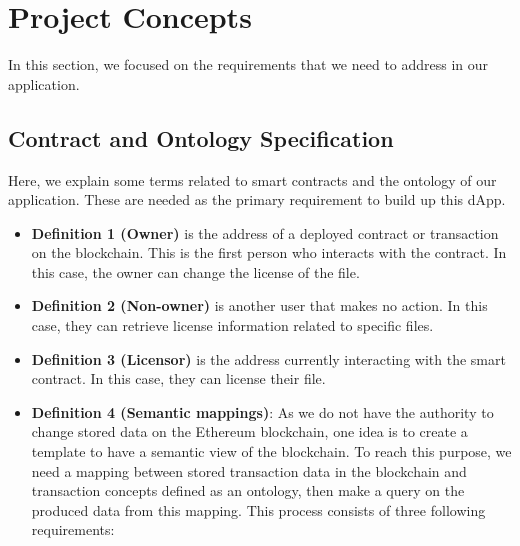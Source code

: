 \section{Project Concepts}

In this section, we focused on the requirements that we need to address in our application.
\\
\subsection{Contract and Ontology Specification}
Here, we explain some terms related to smart contracts and the ontology of our application. These are needed as the primary requirement to build up this dApp.
\begin{itemize}
\item \textbf{Definition 1 (Owner)} is the address of a deployed contract or transaction on the blockchain. This is the first person who interacts with the contract. In this case, the owner can change the license of the file.\\
	\item \textbf{Definition 2 (Non-owner)} is another user that makes no action. In this case, they can retrieve license information related to specific files.\\
	\item \textbf{Definition 3 (Licensor)} is the address currently interacting with the smart contract. In this case, they can license their file.\\ 
	\item \textbf{Definition 4 (Semantic mappings)}: As we do not have the authority to change stored data on the Ethereum blockchain, one idea is to create a template to have a semantic view of the blockchain.
	To reach this purpose, we need a mapping between stored transaction data in the blockchain and transaction concepts defined as an ontology, then make a query on the produced data from this mapping. This process consists of three following requirements:
	

\end{itemize}
